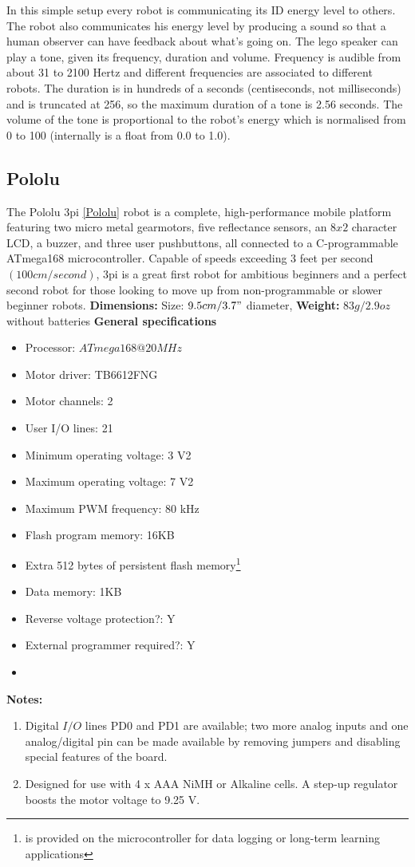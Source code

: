 In this simple setup every robot is communicating its ID energy level to others.
The robot also communicates his energy level by producing a sound so that a human observer can have feedback about what's going on.
The lego speaker can play a tone, given its frequency, duration and volume. Frequency is audible from about 31 to 2100 Hertz and different frequencies are associated to different robots. The duration is in hundreds of a seconds (centiseconds, not milliseconds) and is truncated at 256, so the maximum duration of a tone is 2.56 seconds. The volume of the tone is proportional to the robot's energy which is normalised from 0 to 100 (internally is a float from 0.0 to 1.0).

\subsection{Pololu \label{Pololu}}

The Pololu 3pi \ref{Pololu}  robot is a complete, high-performance mobile platform featuring two micro metal gearmotors, five reflectance sensors, an $8x2$ character LCD, a buzzer, and three user pushbuttons, all connected to a C-programmable ATmega168 microcontroller. Capable of speeds exceeding 3 feet per second $(100 cm/second)$, 3pi is a great first robot for ambitious beginners and a perfect second robot for those looking to move up from non-programmable or slower beginner robots.
\textbf{Dimensions:}
Size: 	$9.5 cm/3.7"$ diameter,
\textbf{Weight:}
$83 g/2.9 oz$ without batteries
\textbf{General specifications}
\begin{itemize}
\item Processor: 	$ATmega168 @ 20 MHz$
\item Motor driver: 	TB6612FNG
\item Motor channels: 	2
\item User I/O lines: 	21
\item Minimum operating voltage: 	3 V2
\item Maximum operating voltage: 	7 V2
\item Maximum PWM frequency: 	80 kHz
\item Flash program memory: 16KB
\item Extra 512 bytes of persistent flash memory\footnote{is provided on the microcontroller for data logging or long-term learning applications}
\item Data memory: 1KB
\item Reverse voltage protection?: 	Y
\item External programmer required?: 	Y
\item
\end{itemize}
\textbf{Notes:}
\begin{enumerate}
\item Digital $I/O$ lines PD0 and PD1 are available; two more analog inputs and one analog/digital pin can be made available by removing jumpers and disabling special features of the board.
\item Designed for use with 4 x AAA NiMH or Alkaline cells. A step-up regulator boosts the motor voltage to 9.25 V.
\end{enumerate}

